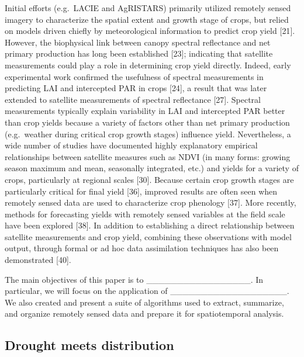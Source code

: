 \documentclass[10pt,letterpaper]{article}
\begin{document}
Initial efforts (e.g.~LACIE and AgRISTARS) primarily utilized remotely
sensed imagery to characterize the spatial extent and growth stage of
crops, but relied on models driven chiefly by meteorological information
to predict crop yield {[}21{]}. However, the biophysical link between
canopy spectral reflectance and net primary production has long been
established {[}23{]}; indicating that satellite measurements could play
a role in determining crop yield directly. Indeed, early experimental
work confirmed the usefulness of spectral measurements in predicting LAI
and intercepted PAR in crops {[}24{]}, a result that was later extended
to satellite measurements of spectral reflectance {[}27{]}. Spectral
measurements typically explain variability in LAI and intercepted PAR
better than crop yields because a variety of factors other than net
primary production (e.g.~weather during critical crop growth stages)
influence yield. Nevertheless, a wide number of studies have documented
highly explanatory empirical relationships between satellite measures
such as NDVI (in many forms: growing season maximum and mean, seasonally
integrated, etc.) and yields for a variety of crops, particularly at
regional scales {[}30{]}. Because certain crop growth stages are
particularly critical for final yield {[}36{]}, improved results are
often seen when remotely sensed data are used to characterize crop
phenology {[}37{]}. More recently, methods for forecasting yields with
remotely sensed variables at the field scale have been explored
{[}38{]}. In addition to establishing a direct relationship between
satellite measurements and crop yield, combining these observations with
model output, through formal or ad hoc data assimilation techniques has
also been demonstrated {[}40{]}.

The main objectives of this paper is to
\_\_\_\_\_\_\_\_\_\_\_\_\_\_\_\_\_. In particular, we will focus on the
application of \_\_\_\_\_\_\_\_\_\_\_\_\_\_\_\_\_\_\_. We also created
and present a suite of algorithms used to extract, summarize, and
organize remotely sensed data and prepare it for spatiotemporal
analysis.

\subsection{Drought meets
distribution}\label{drought-meets-distribution}
\end{document}
